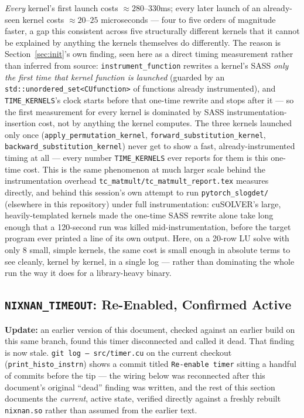 \documentclass[11pt]{article}
\begin{document}
\emph{Every} kernel's first launch costs $\approx\!280$--$330$ms;
every later launch of an already-seen kernel costs $\approx\!20$--$25$
microseconds --- four to five orders of magnitude faster, a gap this
consistent across five structurally different kernels that it cannot be
explained by anything the kernels themselves do differently. The reason
is Section~\ref{sec:init}'s own finding, seen here as a direct timing
measurement rather than inferred from source: \texttt{instrument\_function}
rewrites a kernel's SASS \emph{only the first time that kernel function is
launched} (guarded by an \texttt{std::unordered\_set<CUfunction>} of
functions already instrumented), and \texttt{TIME\_KERNELS}'s clock
starts before that one-time rewrite and stops after it --- so the first
measurement for every kernel is dominated by SASS instrumentation-insertion
cost, not by anything the kernel computes. The three kernels launched only
once (\texttt{apply\_permutation\_kernel},
\texttt{forward\_substitution\_kernel}, \texttt{backward\_substitution\_kernel})
never get to show a fast, already-instrumented timing at all --- every
number \texttt{TIME\_KERNELS} ever reports for them is this one-time cost.
This is the same phenomenon at much larger scale behind the instrumentation
overhead \texttt{tc\_matmult/tc\_matmult\_report.tex} measures directly, and
behind this session's own attempt to run \texttt{pytorch\_slogdet/}
(elsewhere in this repository) under full instrumentation: cuSOLVER's
large, heavily-templated kernels made the one-time SASS rewrite alone take
long enough that a 120-second run was killed mid-instrumentation, before
the target program ever printed a line of its own output. Here, on a
20-row LU solve with only 8 small, simple kernels, the same cost is small
enough in absolute terms to see cleanly, kernel by kernel, in a single log
--- rather than dominating the whole run the way it does for a
library-heavy binary.

\subsection{\texttt{NIXNAN\_TIMEOUT}: Re-Enabled, Confirmed Active}
\label{sec:timeout-reenabled}

\textbf{Update:} an earlier version of this document, checked against an
earlier build on this same branch, found this timer disconnected and
called it dead. That finding is now stale. \texttt{git log -- src/timer.cu}
on the current checkout (\texttt{print\_histo\_instrn}) shows a commit
titled \texttt{Re-enable timer} sitting a handful of commits before the
tip --- the wiring below was reconnected after this document's original
``dead'' finding was written, and the rest of this section documents the
\emph{current}, active state, verified directly against a freshly rebuilt
\texttt{nixnan.so} rather than assumed from the earlier text.
\end{document}
